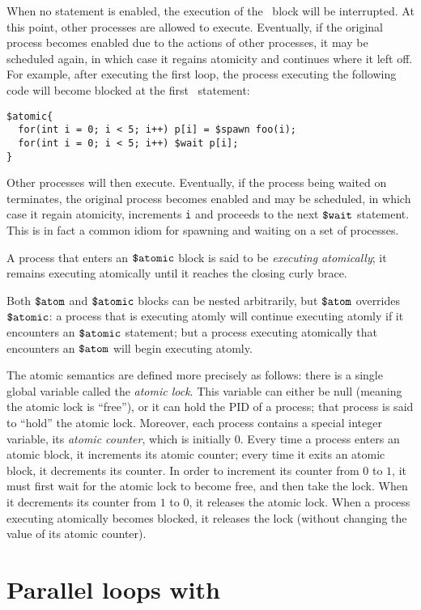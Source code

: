 When no statement is enabled, the execution of the \catomic\ block
will be interrupted.  At this point, other processes are allowed to
execute.  Eventually, if the original process becomes enabled due to
the actions of other processes, it may be scheduled again, in which
case it regains atomicity and continues where it left off.  For
example, after executing the first loop, the process executing the
following code will become blocked at the first \cwait\ statement:
 \begin{verbatim}  
$atomic{
  for(int i = 0; i < 5; i++) p[i] = $spawn foo(i);
  for(int i = 0; i < 5; i++) $wait p[i];
}
\end{verbatim}
Other processes will then execute. Eventually, if the process being
waited on terminates, the original process becomes enabled and may be
scheduled, in which case it regain atomicity, increments \texttt{i}
and proceeds to the next $\mbox{\texttt{\${}wait}}$ statement.  This is in fact a common
idiom for spawning and waiting on a set of processes.

A process that enters an $\mbox{\texttt{\${}atomic}}$ block is said to be
\emph{executing atomically}; it remains executing atomically until it
reaches the closing curly brace.

Both $\mbox{\texttt{\${}atom}}$ and $\mbox{\texttt{\${}atomic}}$ blocks can be nested arbitrarily, but
$\mbox{\texttt{\${}atom}}$ overrides $\mbox{\texttt{\${}atomic}}$: a process that is executing atomly will
continue executing atomly if it encounters an $\mbox{\texttt{\${}atomic}}$ statement;
but a process executing atomically that encounters an $\mbox{\texttt{\${}atom}}$ will
begin executing atomly.

The atomic semantics are defined more precisely as follows: there is a
single global variable called the \emph{atomic lock}. This variable
can either be null (meaning the atomic lock is ``free''), or it can
hold the PID of a process; that process is said to ``hold'' the atomic
lock.  Moreover, each process contains a special integer variable, its
\emph{atomic counter}, which is initially 0.  Every time a process
enters an atomic block, it increments its atomic counter; every time
it exits an atomic block, it decrements its counter.  In order to
increment its counter from $0$ to $1$, it must first wait for the
atomic lock to become free, and then take the lock.  When it
decrements its counter from $1$ to $0$, it releases the atomic lock.
When a process executing atomically becomes blocked, it releases the
lock (without changing the value of its atomic counter).

\section{Parallel loops with \cparfor}
\label{sec:parfor}

